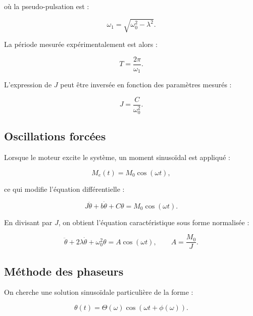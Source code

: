 où la pseudo-pulsation est :

\begin{equation}
\omega_1 = \sqrt{\omega_0^2 - \lambda^2}.
\label{eq:w}
\end{equation}

La période mesurée expérimentalement est alors :

\begin{equation}
T = \frac{2\pi}{\omega_1}.
\label{eq:t}
\end{equation}

L’expression de $J$ peut être inversée en fonction des paramètres mesurés :

\begin{equation}
J = \frac{C}{\omega_0^2}.
\label{eq:J}
\end{equation}


\subsection{Oscillations forcées} \label{subsec:osc_forcees}

Lorsque le moteur excite le système, un moment sinusoïdal est appliqué :

\begin{equation}
M_e(t) = M_0 \cos(\omega t),
\label{eq:moment_excitation}
\end{equation}

ce qui modifie l'équation différentielle :

\begin{equation}
J\ddot{\theta} + b\dot{\theta} + C\theta = M_0\cos(\omega t).
\label{eq:equa_forcee_brut}
\end{equation}

En divisant par $J$, on obtient l'équation caractéristique sous forme normalisée :

\begin{equation}
\ddot{\theta} + 2\lambda \dot{\theta} + \omega_0^2 \theta
= A\cos(\omega t),
\qquad A = \frac{M_0}{J}.
\label{eq:equa_forcee_normalisee}
\end{equation}


\subsection{Méthode des phaseurs} \label{subsec:phaseurs}

On cherche une solution sinusoïdale particulière de la forme :

\begin{equation}
\theta(t) = \Theta(\omega)\cos(\omega t + \phi(\omega)).
\label{eq:solution_phaseurs}
\end{equation}

